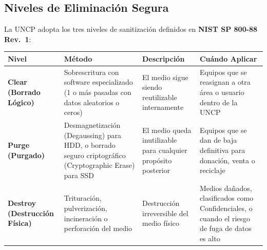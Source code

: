 \documentclass[10pt,letterpaper]{article}
\begin{document}
\subsection{Niveles de Eliminación
Segura}\label{niveles-de-eliminaciuxf3n-segura}

La UNCP adopta los tres niveles de sanitización definidos en
\textbf{NIST SP 800-88 Rev.~1}:

{\setlength{\RaggedRightRightskip}{0pt plus 5em}\small\sloppy \begin{longtable}[]{@{}
  >{\hspace{0pt}\RaggedRight\arraybackslash}p{}
  >{\hspace{0pt}\RaggedRight\arraybackslash}p{}
  >{\hspace{0pt}\RaggedRight\arraybackslash}p{}
  >{\hspace{0pt}\RaggedRight\arraybackslash}p{}@{}}
\toprule\noalign{}
\begin{minipage}[b]{\linewidth}\raggedright
Nivel
\end{minipage} & \begin{minipage}[b]{\linewidth}\raggedright
Método
\end{minipage} & \begin{minipage}[b]{\linewidth}\raggedright
Descripción
\end{minipage} & \begin{minipage}[b]{\linewidth}\raggedright
Cuándo Aplicar
\end{minipage} \\
\midrule\noalign{}
\endhead
\bottomrule\noalign{}
\endlastfoot
\textbf{Clear (Borrado Lógico)} & Sobrescritura con software
especializado (1 o más pasadas con datos aleatorios o ceros) & El medio
sigue siendo reutilizable internamente & Equipos que se reasignan a otra
área o usuario dentro de la UNCP \\
\textbf{Purge (Purgado)} & Desmagnetización (Degaussing) para HDD, o
borrado seguro criptográfico (Cryptographic Erase) para SSD & El medio
queda inutilizable para cualquier propósito posterior & Equipos que se
dan de baja definitiva para donación, venta o reciclaje \\
\textbf{Destroy (Destrucción Física)} & Trituración, pulverización,
incineración o perforación del medio & Destrucción irreversible del
medio físico & Medios dañados, clasificados como Confidenciales, o
cuando el riesgo de fuga de datos es alto \\
\end{longtable}\normalsize}
\end{document}

